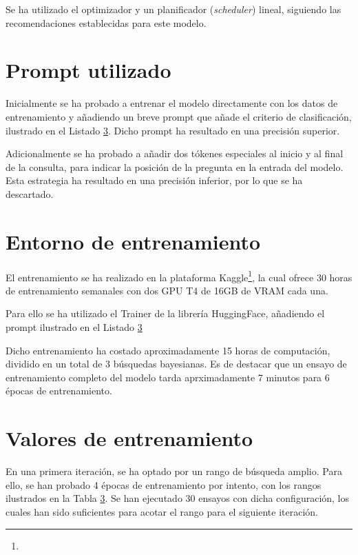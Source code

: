 Se ha utilizado el optimizador  y un planificador (\textit{scheduler}) lineal, siguiendo las recomendaciones establecidas para este modelo.

\section{Prompt utilizado}
Inicialmente se ha probado a entrenar el modelo directamente con los datos de entrenamiento y añadiendo un breve prompt que añade el criterio de clasificación, ilustrado en el Listado \ref{}. Dicho prompt ha resultado en una precisión superior.  

Adicionalmente se ha probado a añadir dos tókenes especiales al inicio y al final de la consulta, para indicar la posición de la pregunta en la entrada del modelo. Esta estrategia ha resultado en una precisión inferior, por lo que se ha descartado. 

\section{Entorno de entrenamiento}
El entrenamiento se ha realizado en la plataforma Kaggle\footnote{}, la cual ofrece 30 horas de entrenamiento semanales con dos GPU T4 de 16GB de VRAM cada una.

Para ello se ha utilizado el Trainer de la librería HuggingFace, añadiendo el prompt ilustrado en el Listado \ref{}  

Dicho entrenamiento ha costado aproximadamente 15 horas de computación, dividido en un total de 3 búsquedas bayesianas. Es de destacar que un ensayo de entrenamiento completo del modelo tarda aprximadamente 7 minutos para 6 épocas de entrenamiento. 

\section{Valores de entrenamiento}
En una primera iteración, se ha optado por un rango de búsqueda amplio. Para ello, se han probado 4 épocas de entrenamiento por intento, con los rangos ilustrados en la Tabla \ref{}. Se han ejecutado 30 ensayos con dicha configuración, los cuales han sido suficientes para acotar el rango para el siguiente iteración. 

